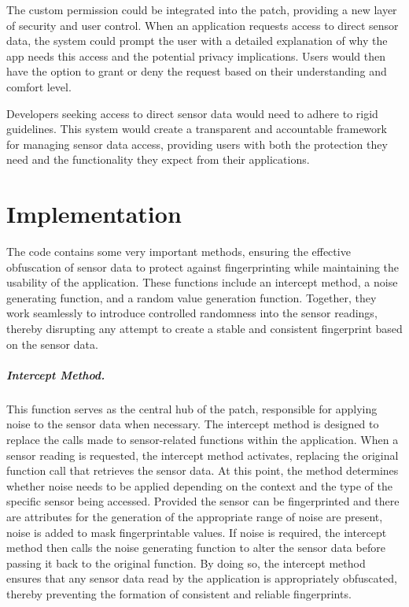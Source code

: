 \documentclass[11pt,
  oneside,openany,    %
]{scrreprt}
\begin{document}
The custom permission could be integrated into the patch, providing a new layer of security and user control. 
When an application requests access to direct sensor data, the system could prompt the user with a detailed explanation of why the app needs this access and the potential privacy implications. 
Users would then have the option to grant or deny the request based on their understanding and comfort level.

Developers seeking access to direct sensor data would need to adhere to rigid guidelines.
This system would create a transparent and accountable framework for managing sensor data access, providing users with both the protection they need and the functionality they expect from their applications.

\chapter{Implementation}
\label{chap:implementation}
The code contains some very important methods, ensuring the effective obfuscation of sensor data to protect against fingerprinting while maintaining the usability of the application. 
These functions include an intercept method, a noise generating function, and a random value generation function. 
Together, they work seamlessly to introduce controlled randomness into the sensor readings, thereby disrupting any attempt to create a stable and consistent fingerprint based on the sensor data.

\paragraph{Intercept Method.}
\label{par:intercept_method}
This function serves as the central hub of the patch, responsible for applying noise to the sensor data when necessary.
The intercept method is designed to replace the calls made to sensor-related functions within the application. 
When a sensor reading is requested, the intercept method activates, replacing the original function call that retrieves the sensor data.
At this point, the method determines whether noise needs to be applied depending on the context and the type of the specific sensor being accessed. 
Provided the sensor can be fingerprinted and there are attributes for the generation of the appropriate range of noise are present, noise is added to mask fingerprintable values.
If noise is required, the intercept method then calls the noise generating function to alter the sensor data before passing it back to the original function. 
By doing so, the intercept method ensures that any sensor data read by the application is appropriately obfuscated, thereby preventing the formation of consistent and reliable fingerprints.
\end{document}
